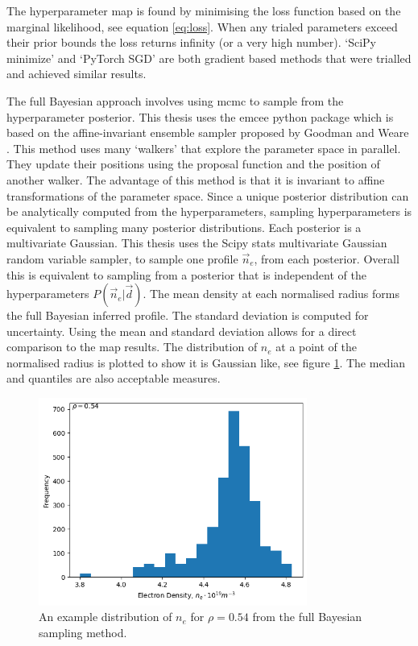 The hyperparameter \gls{map} is found by minimising the loss function based on the marginal likelihood, see equation \ref{eq:loss}. When any trialed parameters exceed their prior bounds the loss returns infinity (or a very high number). `SciPy minimize' and `PyTorch SGD' are both gradient based methods that were trialled and achieved similar results.

The full Bayesian approach involves using \gls{mcmc} to sample from the hyperparameter posterior. This thesis uses the emcee python package which is based on the affine-invariant ensemble sampler proposed by Goodman and Weare \cite{emceeGoodman}. This method uses many `walkers' that explore the parameter space in parallel. They update their positions using the proposal function and the position of another walker. The advantage of this method is that it is invariant to affine transformations of the parameter space. Since a unique posterior distribution can be analytically computed from the hyperparameters, sampling hyperparameters is equivalent to sampling many posterior distributions. Each posterior is a multivariate Gaussian. This thesis uses the Scipy stats multivariate Gaussian random variable sampler, to sample one profile $\vec n_e$, from each posterior. Overall this is equivalent to sampling from a posterior that is independent of the hyperparameters $P(\vec n_e | \vec d)$. The mean density at each normalised radius forms the full Bayesian inferred profile. The standard deviation is computed for uncertainty. Using the mean and standard deviation allows for a direct comparison to the \gls{map} results. The distribution of $n_e$ at a point of the normalised radius is plotted to show it is Gaussian like, see figure \ref{fig:ne_dist}. The median and quantiles are also acceptable measures.

\begin{figure}[H]
    \centering
    \includegraphics[width=250pt]{images/Final/sampled_ne_dist.png}
    \caption{An example distribution of $n_e$ for $\rho=0.54$ from the full Bayesian sampling method.}
    \label{fig:ne_dist}
\end{figure}

